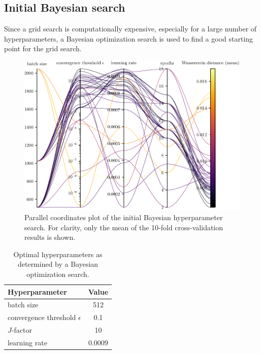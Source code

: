 \subsection{Initial Bayesian search} \label{sec:hyperparameters:initial_bayesian}
Since a grid search is computationally expensive,
  especially for a large number of hyperparameters,
a Bayesian optimization search \cite{wandb_bayesian} is used to find a good starting point for the grid search.

\begin{figure}
  \centering
  \includegraphics[scale=1]{content/plots/hyperparam/combined_pcplot_full.pdf}
  \caption{
    Parallel coordinates plot of the initial Bayesian hyperparameter search.
    For clarity, only the mean of the 10-fold cross-validation results is shown.
    }
  \label{fig:hyperparameter:bayesian}
\end{figure}

\begin{table}
    \centering
    \caption{
      Optimal hyperparameters as determined by a Bayesian optimization search.
    }
    \label{tab:hyperparameters:initial}
    \begin{tabular}{l S}
        \toprule
        Hyperparameter & {Value} \\
        \midrule
        batch size & 512 \\
        convergence threshold $\epsilon$ & 0.1 \\
        $J$-factor & 10 \\
        learning rate & 0.0009 \\
        \bottomrule
    \end{tabular}
\end{table}


